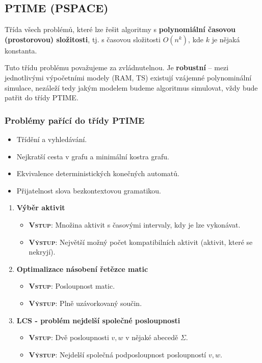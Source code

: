 \subsection{PTIME (PSPACE)}
Třída všech problémů, které lze řešit algoritmy s \textbf{polynomiální časovou (prostorovou) složitosti}, tj. s časovou složitosti $O (n^k)$, kde $k$ je nějaká konstanta. 

Tuto třídu problému považujeme za zvládnutelnou. Je \textbf{robustní} -- mezi jednotlivými výpočetními modely (RAM, TS) existují vzájemné polynominální simulace, nezáleží tedy jakým modelem budeme algoritmus simulovat, vždy bude patřit do třídy PTIME.
\subsubsection{Problémy pařící do třídy PTIME}
\begin{itemize}
\item Třídění a vyhledávání.
\item Nejkratší cesta v grafu
a minimální kostra grafu.
\item Ekvivalence deterministických konečných automatů.
\item Přijatelnost slova bezkontextovou gramatikou.
\end{itemize}


\begin{enumerate}
\item \textbf{Výběr aktivit}
\begin{itemize}
	\item \textbf{\textsc{Vstup}}: Množina aktivit s časovými intervaly, kdy je lze vykonávat.
	\item \textbf{\textsc{Výstup}}: Největší možný počet kompatibilních aktivit (aktivit, které se nekryjí).
\end{itemize}
\item \textbf{Optimalizace násobení řetězce matic}
\begin{itemize}
	\item \textbf{\textsc{Vstup}}: Posloupnost matic.
	\item \textbf{\textsc{Výstup}}: Plně uzávorkovaný součin.
\end{itemize}
\item \textbf{LCS - problém nejdelší společné posloupnosti}
\begin{itemize}
	\item \textbf{\textsc{Vstup}}: Dvě posloupnosti $v,w$ v nějaké abecedě $\Sigma$.
	\item \textbf{\textsc{Výstup}}: Nejdelší společná podposloupnost posloupností $v,w$.
\end{itemize}
\end{enumerate}

